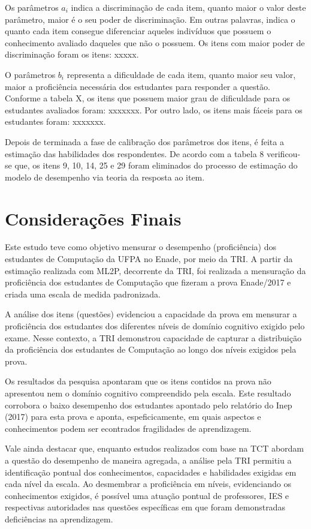 \documentclass[12pt]{article}
\begin{document}
\newpage
Os parâmetros $a_{i}$ indica a discriminação de cada item, quanto maior o valor deste parâmetro, maior é o seu poder de discriminação. Em outras palavras, indica o quanto cada item consegue diferenciar aqueles indivíduos que possuem o conhecimento avaliado daqueles que não o possuem. Os itens com maior poder de discriminação foram os itens: xxxxx. 

O parâmetros $b_{i}$ representa a dificuldade de cada item, quanto maior seu valor, maior a proficiência necessária dos estudantes para responder a questão. Conforme a tabela X, os itens que possuem maior grau de dificuldade para os estudantes avaliados foram: xxxxxxx. Por outro lado, os itens mais fáceis para os estudantes foram: xxxxxxx.

Depois de terminada a fase de calibração dos parâmetros dos itens, é feita a estimação das habilidades dos respondentes. De acordo com a tabela 8 verificou-se que, os itens 9, 10, 14, 25 e 29 foram eliminados do processo de estimação do modelo de desempenho via teoria da resposta ao item.




\newpage
\section{Considerações Finais}

Este estudo teve como objetivo mensurar o desempenho (proficiência) dos estudantes de Computação da UFPA no Enade, por meio da TRI. A partir da estimação realizada com ML2P, decorrente da TRI, foi realizada a mensuração da proficiência dos estudantes de Computação que fizeram a prova Enade/2017 e criada uma escala de medida padronizada.

A análise dos itens (questões) evidenciou a capacidade da prova em mensurar a proficiência dos estudantes dos diferentes níveis de domínio cognitivo exigido pelo exame. Nesse contexto, a TRI demonstrou capacidade de capturar a distribuição da proficiência dos estudantes de Computação ao longo dos níveis exigidos pela prova.

Os resultados da pesquisa apontaram que os itens contidos na prova não apresentou nem o domínio cognitivo compreendido pela escala. Este resultado corrobora  o baixo desempenho dos estudantes apontado pelo relatório do Inep (2017) para esta prova e aponta, espeficicamente, em quais aspectos e conhecimentos podem ser econtrados fragilidades de aprendizagem.

Vale ainda destacar que, enquanto estudos realizados com base na TCT abordam a questão do desempenho de maneira agregada, a análise pela TRI permitiu a identificação pontual dos conhecimentos, capacidades e habilidades exigidas em cada nível da escala. Ao desmembrar a proficiência em níveis, evidenciando os conhecimentos exigidos, é possível uma atuação pontual de professores, IES e respectivas autoridades nas questões específicas em que foram demonstradas deficiências na aprendizagem. 
\end{document}
